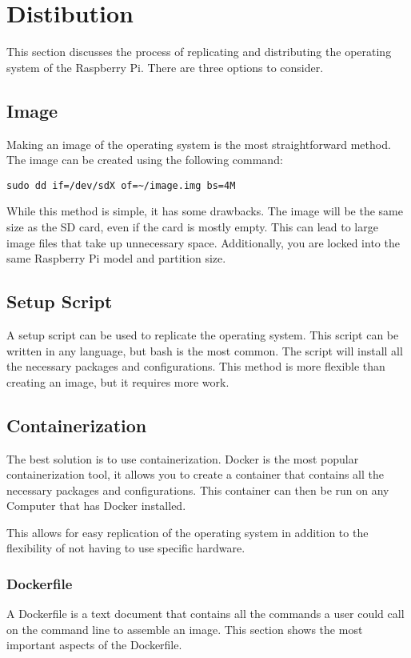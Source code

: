 \section{Distibution}
This section discusses the process of replicating and distributing the
operating system of the Raspberry Pi. There are three options
to consider. 
    \subsection{Image}
    Making an image of the operating system is the most
    straightforward method. The image can be created using
    the following command:
    \begin{verbatim}
sudo dd if=/dev/sdX of=~/image.img bs=4M
    \end{verbatim}
    While this method is simple, it has some drawbacks. The
    image will be the same size as the SD card, even if the
    card is mostly empty. This can lead to large image files
    that take up unnecessary space. Additionally, you are
    locked into the same Raspberry Pi model and partition
    size.

    \subsection{Setup Script}
    A setup script can be used to replicate the operating
    system. This script can be written in any language, but
    bash is the most common. The script will install all the
    necessary packages and configurations. This method is
    more flexible than creating an image, but it requires
    more work.

    \subsection{Containerization}
    The best solution is to use containerization. Docker is
    the most popular containerization tool, it allows
    you to create a container that contains all the necessary
    packages and configurations. This container can then be
    run on any Computer that has Docker installed. \npar

    This allows for easy replication of the operating system in
    addition to the flexibility of not having to use specific
    hardware. 

        \subsubsection{Dockerfile}
        A Dockerfile is a text document that contains all the 
        commands a user could call on the command line to assemble 
        an image. This section shows the most important aspects of the
        Dockerfile. \cite{dockerfile_reference} \npar

